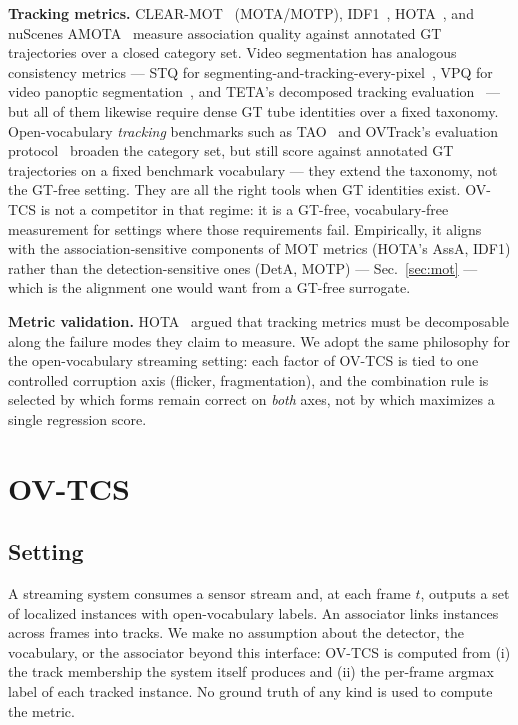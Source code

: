 \documentclass[10pt,twocolumn,letterpaper]{article}
\begin{document}
\noindent\textbf{Tracking metrics.}
CLEAR-MOT~\cite{clearmot} (MOTA/MOTP), IDF1~\cite{idf1},
HOTA~\cite{hota}, and nuScenes AMOTA~\cite{nuscenes_tracking} measure
association quality against annotated GT trajectories over a closed category
set. Video segmentation has analogous consistency metrics --- STQ for
segmenting-and-tracking-every-pixel~\cite{step}, VPQ for video panoptic
segmentation~\cite{vpq}, and TETA's decomposed tracking
evaluation~\cite{teta} --- but all of them likewise require dense GT tube
identities over a fixed taxonomy. Open-vocabulary \emph{tracking} benchmarks
such as TAO~\cite{tao} and OVTrack's evaluation protocol~\cite{ovtrack}
broaden the category set, but still score against annotated GT trajectories
on a fixed benchmark vocabulary --- they extend the taxonomy, not the
GT-free setting. They are all the right tools when GT identities
exist. OV-TCS is not a
competitor in that regime: it is a GT-free, vocabulary-free measurement for
settings where those requirements fail. Empirically, it aligns with the
association-sensitive components of MOT metrics (HOTA's AssA, IDF1) rather
than the detection-sensitive ones (DetA, MOTP) --- Sec.~\ref{sec:mot} --- which
is the alignment one would want from a GT-free surrogate.

\noindent\textbf{Metric validation.}
HOTA~\cite{hota} argued that tracking metrics must be decomposable along the
failure modes they claim to measure. We adopt the same philosophy for the
open-vocabulary streaming setting: each factor of OV-TCS is tied to one
controlled corruption axis (flicker, fragmentation), and the combination rule
is selected by which forms remain correct on \emph{both} axes, not by which
maximizes a single regression score.

\section{OV-TCS}
\label{sec:metric}

\subsection{Setting}
A streaming system consumes a sensor stream and, at each frame $t$, outputs a
set of localized instances with open-vocabulary labels. An associator links
instances across frames into tracks. We make no assumption about the
detector, the vocabulary, or the associator beyond this interface: OV-TCS is
computed from (i) the track membership the system itself produces and (ii)
the per-frame argmax label of each tracked instance. No ground truth of any
kind is used to compute the metric.
\end{document}
